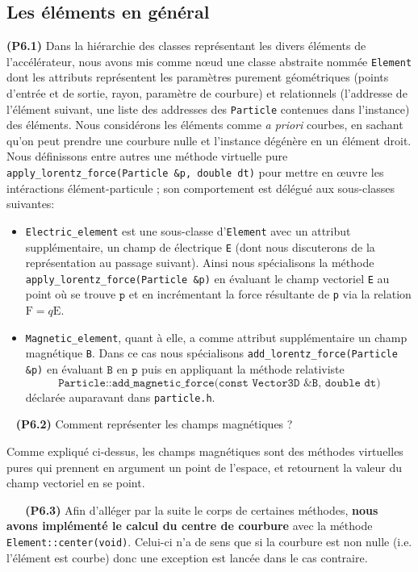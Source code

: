 \documentclass[12pt, letterpaper, twoside]{article}
\newcommand{\T}[1]{\texttt{#1}}
\begin{document}
\subsection{Les éléments en général}
\noindent \textbf{(P6.1)} Dans la hiérarchie des classes représentant les divers éléments de l'accélérateur, nous avons mis comme nœud une classe abstraite nommée \T{Element} dont les attributs représentent les paramètres purement géométriques (points d'entrée et de sortie, rayon, paramètre de courbure) et relationnels (l'addresse de l'élément suivant, une liste des addresses des \T{Particle} contenues dans l'instance) des éléments. Nous considérons les éléments comme \textit{a priori} courbes, en sachant qu'on peut prendre une courbure nulle et l'instance dégénère en un élément droit. Nous définissons entre autres une méthode virtuelle pure \T{apply\_lorentz\_force(Particle \&p, double dt)} pour mettre en œuvre les intéractions élément-particule ; son comportement est délégué aux sous-classes suivantes:

\begin{itemize}
\item \T{Electric\_element} est une sous-classe d'\T{Element} avec un attribut supplémentaire, un champ de électrique \T{E} (dont nous discuterons de la représentation au passage suivant). Ainsi nous spécialisons la méthode \T{apply\_lorentz\_force(Particle \&p)} en évaluant le champ vectoriel \T{E} au point où se trouve $\T{p}$ et en incrémentant la force résultante de \T{p} via la relation $\boldsymbol{\mathrm{F}}=q\boldsymbol{\mathrm{E}}$.

\item \T{Magnetic\_element}, quant à elle, a comme attribut supplémentaire un champ magnétique \T{B}. Dans ce cas nous spécialisons \T{add\_lorentz\_force(Particle \&p)} en évaluant $\T{B}$ en $\T{p}$ puis en appliquant la méthode relativiste $$\T{Particle::add\_magnetic\_force(const Vector3D \&B, double dt)}$$ déclarée auparavant dans \T{particle.h}.

\end{itemize}

\ \linebreak
\textbf{(P6.2)} Comment représenter les champs magnétiques ?

Comme expliqué ci-dessus, les champs magnétiques sont des méthodes virtuelles pures qui prennent en argument un point de l'espace, et retournent la valeur du champ vectoriel en se point.

\ \linebreak
\ \linebreak
\textbf{(P6.3)} Afin d'alléger par la suite le corps de certaines méthodes, \textbf{nous avons implémenté le calcul du centre de courbure} avec la méthode \T{Element::center(void)}. Celui-ci n'a de sens que si la courbure est non nulle (i.e. l'élément est courbe) donc une exception est lancée dans le cas contraire.
\end{document}
